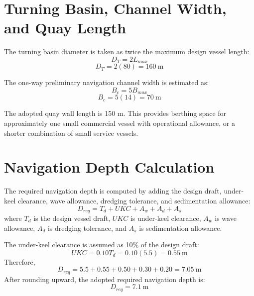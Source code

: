 \documentclass[11pt,a4paper]{article}
\begin{document}
\section{Turning Basin, Channel Width, and Quay Length}
The turning basin diameter is taken as twice the maximum design vessel length:
\begin{equation}
D_T = 2L_{max}
\end{equation}
\begin{equation}
D_T = 2(80) = 160\ \mathrm{m}
\end{equation}

The one-way preliminary navigation channel width is estimated as:
\begin{equation}
B_c = 5B_{max}
\end{equation}
\begin{equation}
B_c = 5(14) = 70\ \mathrm{m}
\end{equation}

The adopted quay wall length is 150 m. This provides berthing space for approximately one small commercial vessel with operational allowance, or a shorter combination of small service vessels.

\section{Navigation Depth Calculation}
The required navigation depth is computed by adding the design draft, under-keel clearance, wave allowance, dredging tolerance, and sedimentation allowance:
\begin{equation}
D_{req} = T_d + UKC + A_w + A_d + A_s
\end{equation}
where $T_d$ is the design vessel draft, $UKC$ is under-keel clearance, $A_w$ is wave allowance, $A_d$ is dredging tolerance, and $A_s$ is sedimentation allowance.

The under-keel clearance is assumed as 10\% of the design draft:
\begin{equation}
UKC = 0.10T_d = 0.10(5.5) = 0.55\ \mathrm{m}
\end{equation}
Therefore,
\begin{equation}
D_{req} = 5.5 + 0.55 + 0.50 + 0.30 + 0.20 = 7.05\ \mathrm{m}
\end{equation}
After rounding upward, the adopted required navigation depth is:
\begin{equation}
\boxed{D_{req} = 7.1\ \mathrm{m}}
\end{equation}
\end{document}
